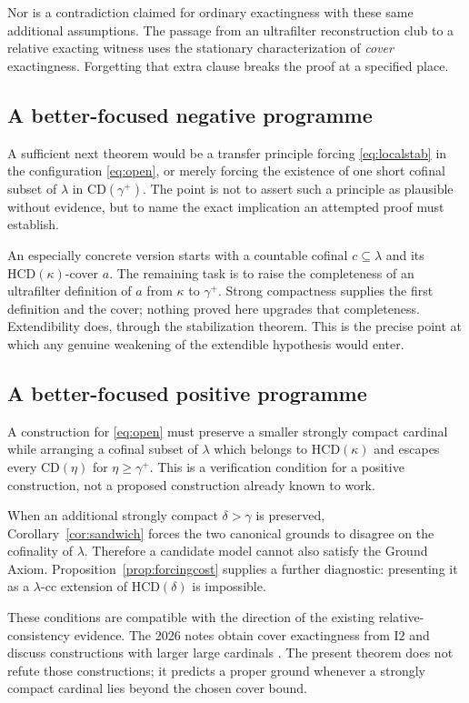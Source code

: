\documentclass[11pt,letterpaper]{article}
\theoremstyle{definition}
\newcommand{\Itwo}{\mathrm{I2}}
\newcommand{\CD}{\mathrm{CD}}
\newcommand{\HCD}{\mathrm{HCD}}
\begin{document}
Nor is a contradiction claimed for ordinary exactingness with these same additional assumptions. The passage from an ultrafilter reconstruction club to a relative exacting witness uses the stationary characterization of \emph{cover} exactingness. Forgetting that extra clause breaks the proof at a specified place.

\subsection{A better-focused negative programme}

A sufficient next theorem would be a transfer principle forcing \eqref{eq:localstab} in the configuration \eqref{eq:open}, or merely forcing the existence of one short cofinal subset of $\lambda$ in $\CD(\gamma^+)$. The point is not to assert such a principle as plausible without evidence, but to name the exact implication an attempted proof must establish.

An especially concrete version starts with a countable cofinal $c\subseteq\lambda$ and its $\HCD(\kappa)$-cover $a$. The remaining task is to raise the completeness of an ultrafilter definition of $a$ from $\kappa$ to $\gamma^+$. Strong compactness supplies the first definition and the cover; nothing proved here upgrades that completeness. Extendibility does, through the stabilization theorem. This is the precise point at which any genuine weakening of the extendible hypothesis would enter.

\subsection{A better-focused positive programme}

A construction for \eqref{eq:open} must preserve a smaller strongly compact cardinal while arranging a cofinal subset of $\lambda$ which belongs to $\HCD(\kappa)$ and escapes every $\CD(\eta)$ for $\eta\geq\gamma^+$. This is a verification condition for a positive construction, not a proposed construction already known to work.

When an additional strongly compact $\delta>\gamma$ is preserved, Corollary~\ref{cor:sandwich} forces the two canonical grounds to disagree on the cofinality of $\lambda$. Therefore a candidate model cannot also satisfy the Ground Axiom. Proposition~\ref{prop:forcingcost} supplies a further diagnostic: presenting it as a $\lambda$-cc extension of $\HCD(\delta)$ is impossible.

These conditions are compatible with the direction of the existing relative-consistency evidence. The 2026 notes obtain cover exactingness from $\Itwo$ and discuss constructions with larger large cardinals \cite[Theorem 3.5 and the discussion following it]{cover}. The present theorem does not refute those constructions; it predicts a proper ground whenever a strongly compact cardinal lies beyond the chosen cover bound.
\end{document}
